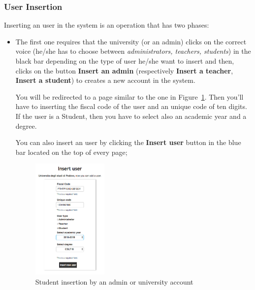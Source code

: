 \subsubsection{User Insertion}
Inserting an user in the system is an operation that has two phases: 
\begin{itemize}
	\item The first one requires that the university (or an admin) clicks on the correct voice (he/she has to choose between \emph{administrators, teachers, students}) in the black bar depending on the type of user he/she want to insert and then, clicks on the button \textbf{Insert an admin} (respectively \textbf{Insert a teacher}, \textbf{Insert a student}) to creates a new account in the system.
	
	You will be redirected to a page similar to the one in Figure~\ref{fig:userInsertionStudent}. Then you'll have to inserting the fiscal code of the user and an unique code of ten digits. If the user is a Student, then you have to select also an academic year and a degree.
	
	You can also insert an user by clicking the \textbf{Insert user} button in the blue bar located on the top of every page;
	\begin{figure}[H]
		\centering
		\includegraphics[width=0.35\textwidth]{img/userInsertionStudent.png}
		\caption{Student insertion by an admin or university account}
		\label{fig:userInsertionStudent}
	\end{figure}
	

\end{itemize}
